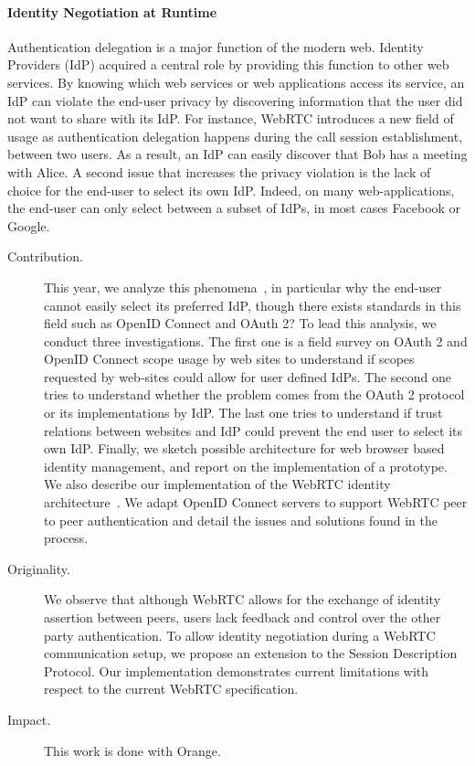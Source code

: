 \paragraph{Identity Negotiation at Runtime}

Authentication delegation is a major function of the modern web. Identity Providers (IdP) acquired a central role by providing this function to other web services. By knowing which web services or web applications access its service, an IdP can violate the end-user privacy by discovering information that the user did not want to share with its IdP. For instance, WebRTC introduces a new field of usage as authentication delegation happens during the call session establishment, between two users. As a result, an IdP can easily discover that Bob has a meeting with Alice. A second issue that increases the privacy violation is the lack of choice for the end-user to select its own IdP. Indeed, on many web-applications, the end-user can only select between a subset of IdPs, in most cases Facebook or Google. 

\begin{description}
\item[Contribution.] This year, we analyze this phenomena~\cite{corre:hal-01611048}, in particular why the end-user cannot easily select its preferred IdP, though there exists standards in this field such as OpenID Connect and OAuth 2? To lead this analysis, we conduct three investigations. The first one is a field survey on OAuth 2 and OpenID Connect scope usage by web sites to understand if scopes requested by web-sites could allow for user defined IdPs. The second one tries to understand whether the problem comes from the OAuth 2 protocol or its implementations by IdP. The last one tries to understand if trust relations between websites and IdP could prevent the end user to select its own IdP. Finally, we sketch possible architecture for web browser based identity management, and report on the implementation of a prototype.
We also describe our implementation of the WebRTC identity architecture~\cite{corre:hal-01611057}. We adapt OpenID Connect servers to support WebRTC peer to peer authentication and detail the issues and solutions found in the process. 
\item[Originality.] We observe that although WebRTC allows for the exchange of identity assertion between peers, users lack feedback and control over the other party authentication. To allow identity negotiation during a WebRTC communication setup, we propose an extension to the Session Description Protocol. Our implementation demonstrates current limitations with respect to the current WebRTC specification.
\item[Impact.] This work is done with Orange. 
\end{description}

